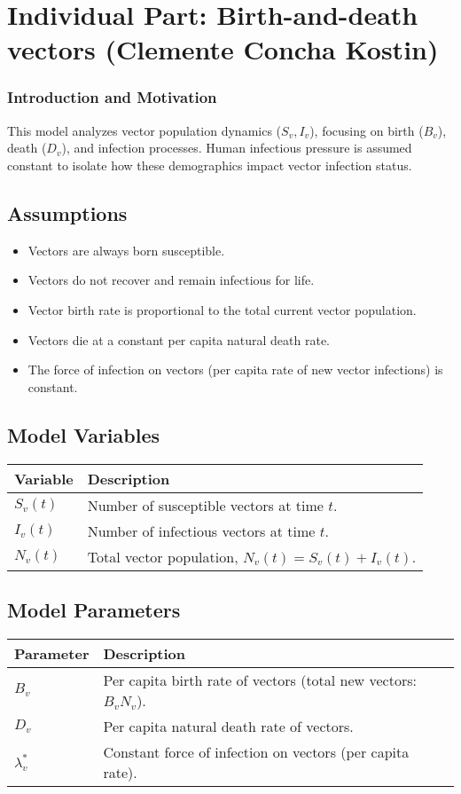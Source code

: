 \section{Individual Part: Birth-and-death vectors (Clemente Concha Kostin)}
\subsubsection*{Introduction and Motivation}
This model analyzes vector population dynamics ($S_v, I_v$), focusing on birth ($B_v$), death ($D_v$), and infection processes. Human infectious pressure is assumed constant to isolate how these demographics impact vector infection status.

\subsection*{Assumptions}

\begin{itemize}[nosep,leftmargin=*,topsep=0.5ex] 
    \item Vectors are always born susceptible.
    \item Vectors do not recover and remain infectious for life.
    \item Vector birth rate is proportional to the total current vector population.
    \item Vectors die at a constant per capita natural death rate.
    \item The force of infection on vectors (per capita rate of new vector infections) is constant.
\end{itemize}

\subsection*{Model Variables}
\noindent
\begin{tabularx}{\linewidth}{@{}l X@{}} %
\toprule
\textbf{Variable} & \textbf{Description} \\
\midrule
$S_v(t)$ & Number of susceptible vectors at time $t$. \\
$I_v(t)$ & Number of infectious vectors at time $t$. \\
$N_v(t)$ & Total vector population, $N_v(t) = S_v(t) + I_v(t)$. \\
\bottomrule
\end{tabularx}

\subsection*{Model Parameters}
\noindent 
\begin{tabularx}{\linewidth}{@{}l X@{}}
\toprule
\textbf{Parameter} & \textbf{Description} \\
\midrule
$B_v$       & Per capita birth rate of vectors (total new vectors: $B_v N_v$). \\
$D_v$       & Per capita natural death rate of vectors. \\
$\lambda_v^*$ & Constant force of infection on vectors (per capita rate). \\
\bottomrule
\end{tabularx}

